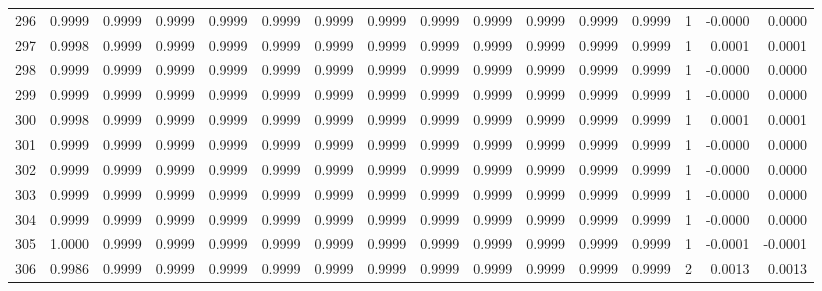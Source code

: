 \begin{tabular}{lrrrrrrrrrrrrrrr}
296 &      0.9999 &  0.9999 &  0.9999 &  0.9999 &  0.9999 &  0.9999 &  0.9999 &  0.9999 &  0.9999 &  0.9999 &   0.9999 &     0.9999 &      1 &                   -0.0000 &                     0.0000 \\
297 &      0.9998 &  0.9999 &  0.9999 &  0.9999 &  0.9999 &  0.9999 &  0.9999 &  0.9999 &  0.9999 &  0.9999 &   0.9999 &     0.9999 &      1 &                    0.0001 &                     0.0001 \\
298 &      0.9999 &  0.9999 &  0.9999 &  0.9999 &  0.9999 &  0.9999 &  0.9999 &  0.9999 &  0.9999 &  0.9999 &   0.9999 &     0.9999 &      1 &                   -0.0000 &                     0.0000 \\
299 &      0.9999 &  0.9999 &  0.9999 &  0.9999 &  0.9999 &  0.9999 &  0.9999 &  0.9999 &  0.9999 &  0.9999 &   0.9999 &     0.9999 &      1 &                   -0.0000 &                     0.0000 \\
300 &      0.9998 &  0.9999 &  0.9999 &  0.9999 &  0.9999 &  0.9999 &  0.9999 &  0.9999 &  0.9999 &  0.9999 &   0.9999 &     0.9999 &      1 &                    0.0001 &                     0.0001 \\
301 &      0.9999 &  0.9999 &  0.9999 &  0.9999 &  0.9999 &  0.9999 &  0.9999 &  0.9999 &  0.9999 &  0.9999 &   0.9999 &     0.9999 &      1 &                   -0.0000 &                     0.0000 \\
302 &      0.9999 &  0.9999 &  0.9999 &  0.9999 &  0.9999 &  0.9999 &  0.9999 &  0.9999 &  0.9999 &  0.9999 &   0.9999 &     0.9999 &      1 &                   -0.0000 &                     0.0000 \\
303 &      0.9999 &  0.9999 &  0.9999 &  0.9999 &  0.9999 &  0.9999 &  0.9999 &  0.9999 &  0.9999 &  0.9999 &   0.9999 &     0.9999 &      1 &                   -0.0000 &                     0.0000 \\
304 &      0.9999 &  0.9999 &  0.9999 &  0.9999 &  0.9999 &  0.9999 &  0.9999 &  0.9999 &  0.9999 &  0.9999 &   0.9999 &     0.9999 &      1 &                   -0.0000 &                     0.0000 \\
305 &      1.0000 &  0.9999 &  0.9999 &  0.9999 &  0.9999 &  0.9999 &  0.9999 &  0.9999 &  0.9999 &  0.9999 &   0.9999 &     0.9999 &      1 &                   -0.0001 &                    -0.0001 \\
306 &      0.9986 &  0.9999 &  0.9999 &  0.9999 &  0.9999 &  0.9999 &  0.9999 &  0.9999 &  0.9999 &  0.9999 &   0.9999 &     0.9999 &      2 &                    0.0013 &                     0.0013 \\

\end{tabular}
